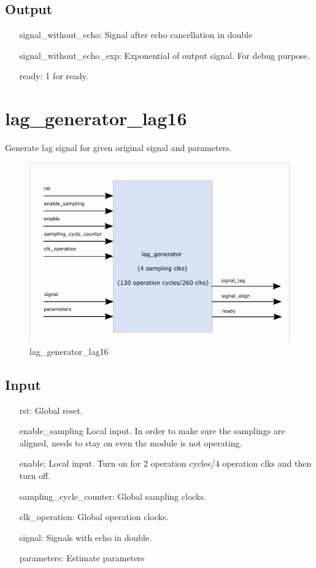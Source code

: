 \documentclass[twoside,a4paper]{refart}
\begin{document}
\subsection{Output}
\begin{itemize}
	\item[signal\_without\_echo:] Signal after echo cancellation in double
	\item[signal\_without\_echo\_exp:] Exponential of output signal. For debug purpose.
	\item[ready:] 1 for ready.
\end{itemize}
\section{lag\_generator\_lag16}
Generate lag signal for given original signal and parameters.
\begin{figure}[H]
	\centering
	\includegraphics[scale=1.2]{lag_generator.png}
	\caption{lag\_generator\_lag16}
	\label{}
\end{figure}
\subsection{Input}
\begin{itemize}
	\item[rst:      ] Global reset.
	\item[enable\_sampling] Local input. In order to make sure the samplings are aligned, needs to stay on even the module is not operating.
	\item[enable:] Local input. Turn on for 2 operation cycles/4 operation clks and then turn off.
	\item[sampling\_cycle\_counter:] Global sampling clocks.
	\item[clk\_operation:] Global operation clocks.
	\item[signal:] Signals with echo in double.
	\item[parameters:] Estimate parameters
\end{itemize}
\end{document}
